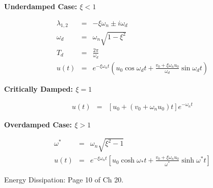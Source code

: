 \documentclass{article}
\begin{document}
\begin{multicols*}{2}
    \textbf{Underdamped Case: $\xi<1$}\par 
    \begin{equation*}
        \begin{array}{lll}
            \lambda_{1,2} & = & -\xi\omega_n\pm i\omega_d\\
            \omega_d & = & \omega_n\sqrt{1-\xi^2}\\
            T_d & = & \frac{2\pi}{\omega_d}\\
            u(t)&=&e^{-\xi\omega_nt}\left(u_0\cos{\omega_dt+\frac{v_0+\xi\omega_nu_0}{\omega_d}\sin{\omega_dt}}\right)
        \end{array}
    \end{equation*}

    \textbf{Critically Damped: $\xi=1$}\par 
    \begin{equation*}
        \begin{array}{lll}
            u(t) & = & [u_0+(v_0+\omega_nu_0)t]e^{-\omega_nt}
        \end{array}
    \end{equation*}

    \textbf{Overdamped Case: $\xi>1$}\par 
    \begin{equation*}
        \begin{array}{lll}
            \omega^* & = & \omega_n\sqrt{\xi^2-1}\\
            u(t) & = & e^{-\xi\omega_nt}\left[u_0\cosh{\omega_*t}+\frac{v_0+\xi\omega_nu_0}{\omega^*}\sinh{\omega^*t}\right]
        \end{array}
    \end{equation*}

    Energy Dissipation: Page 10 of Ch 20.


\end{multicols*}
\end{document}
